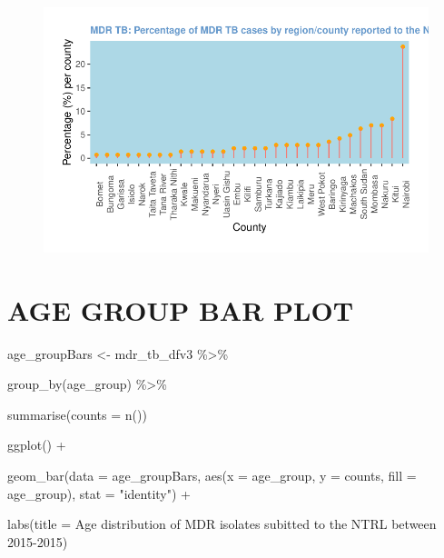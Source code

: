 \documentclass[
]{report}
\newenvironment{Shaded}{\begin{snugshade}}{\end{snugshade}}
\newcommand{\AttributeTok}[1]{\textcolor[rgb]{0.40,0.45,0.13}{#1}}
\newcommand{\FunctionTok}[1]{\textcolor[rgb]{0.28,0.35,0.67}{#1}}
\newcommand{\NormalTok}[1]{\textcolor[rgb]{0.00,0.23,0.31}{#1}}
\newcommand{\OtherTok}[1]{\textcolor[rgb]{0.00,0.23,0.31}{#1}}
\newcommand{\SpecialCharTok}[1]{\textcolor[rgb]{0.37,0.37,0.37}{#1}}
\newcommand{\StringTok}[1]{\textcolor[rgb]{0.13,0.47,0.30}{#1}}
\begin{document}
\begin{figure}[H]

{\centering \includegraphics{MDR_TB_files/figure-pdf/unnamed-chunk-13-1.pdf}

}

\end{figure}

\hypertarget{age-group-bar-plot}{%
\section{AGE GROUP BAR PLOT}\label{age-group-bar-plot}}

\begin{Shaded}
\begin{Highlighting}[]
\NormalTok{age\_groupBars }\OtherTok{\textless{}{-}}\NormalTok{ mdr\_tb\_dfv3 }\SpecialCharTok{\%\textgreater{}\%}

  \FunctionTok{group\_by}\NormalTok{(age\_group) }\SpecialCharTok{\%\textgreater{}\%}

  \FunctionTok{summarise}\NormalTok{(}\AttributeTok{counts =} \FunctionTok{n}\NormalTok{())}

\FunctionTok{ggplot}\NormalTok{() }\SpecialCharTok{+}

  \FunctionTok{geom\_bar}\NormalTok{(}\AttributeTok{data =}\NormalTok{ age\_groupBars, }\FunctionTok{aes}\NormalTok{(}\AttributeTok{x =}\NormalTok{ age\_group, }\AttributeTok{y =}\NormalTok{ counts, }\AttributeTok{fill =}\NormalTok{ age\_group), }\AttributeTok{stat =} \StringTok{"identity"}\NormalTok{) }\SpecialCharTok{+}

  \FunctionTok{labs}\NormalTok{(}\AttributeTok{title =} \StringTok{\textquotesingle{}Age distribution of MDR isolates subitted to the NTRL between 2015{-}2015\textquotesingle{}}\NormalTok{)}
\end{Highlighting}
\end{Shaded}
\end{document}
